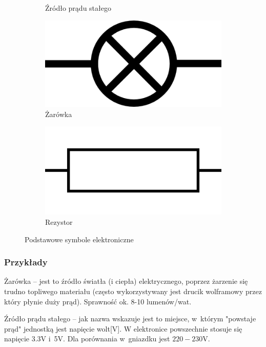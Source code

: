 \documentclass[a4paper,12pt, twoside]{article}
\begin{document}
\begin{figure}
\begin{subfigure}[h]{0.25\textwidth}
      \caption{Źródło prądu stałego}
			\label{fig:DC}
   \end{subfigure}
	\begin{subfigure}[h]{0.25\textwidth}
      \centering
      \includegraphics[scale=0.2]{LightBulb.png}
      \caption{Żarówka}
			\label{fig:zar}
   \end{subfigure}
	\begin{subfigure}[h]{0.25\textwidth}
      \centering
      \includegraphics[scale=0.05]{Resistor-Europe.png}
      \caption{Rezystor}
			\label{fig:rezystor}
   \end{subfigure}
	\caption{Podstawowe symbole elektroniczne}
	\label{fig:symbole}
\end{figure}
\FloatBarrier
   \subsubsection{Przykłady }
	
Żarówka -- jest to źródło światła (i ciepła) elektrycznego, poprzez żarzenie się trudno topliwego materiału (często wykorzystywany jest drucik wolframowy przez który płynie duży prąd). Sprawność ok.
8-10 lumenów/wat. 

Źródło prądu stałego -- jak nazwa wskazuje jest to miejsce, w~którym "powstaje prąd" jednostką jest napięcie wolt[V]. W elektronice powszechnie stosuje się napięcie 3.3V i~5V. Dla porównania w~gniazdku jest $220-230$V.
\end{document}
